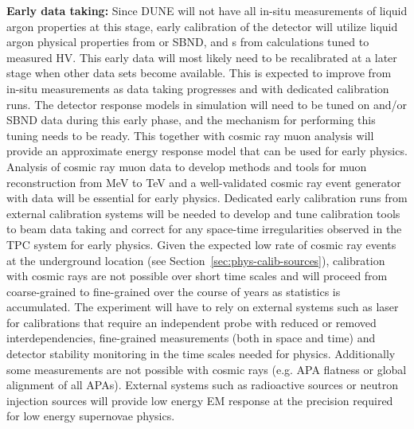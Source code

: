 \textbf{Early data taking:} Since DUNE will not have all in-situ measurements of liquid argon properties at this stage, early calibration of the detector will utilize liquid argon physical properties from  or SBND, and \efield{}s from calculations tuned to measured HV. This early data will most likely need to be recalibrated at a later stage when other data sets become available. This is expected to improve from in-situ measurements as data taking progresses and with dedicated calibration runs. The detector response models in simulation will need to be tuned on  and\slash or SBND data during this early phase, and the mechanism for performing this tuning needs to be ready. This together with cosmic ray muon analysis will provide an approximate energy response model that can be used for early physics. Analysis of cosmic ray muon data to develop methods and tools for muon reconstruction from MeV to TeV and a well-validated cosmic ray event generator with data will be essential for early physics. %
Dedicated early calibration runs from external calibration systems will be needed to develop and tune calibration tools to beam data taking and correct for any space-time irregularities observed in the TPC system for early physics. Given the expected low rate of cosmic ray events at the underground location (see Section~\ref{sec:phys-calib-sources}), calibration with cosmic rays are not possible over short time scales and will proceed from coarse-grained to fine-grained over the course of years as statistics is accumulated. The experiment will have to rely on external systems such as laser for calibrations that require an independent probe with reduced or removed interdependencies, fine-grained measurements (both in space and time) and detector stability monitoring in the time scales needed for physics. Additionally some measurements are not possible with cosmic rays (e.g. APA flatness or global alignment of all APAs). External systems such as radioactive sources or neutron injection sources will provide low energy EM response at the precision required for low energy supernovae physics. 

